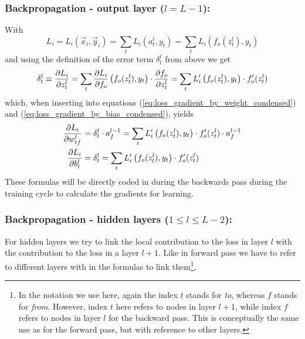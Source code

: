 \subsubsection*{Backpropagation - output layer ($l = L-1$):}

With
\begin{equation}
    L_i = L_i(\vec{x}_i, \vec{y}_i) = \sum\limits_t L_i(a_t^l,y_t)
    = \sum\limits_t L_i \left( f_o(z_t^l),y_t \right)
\end{equation}
and using the definition of the error term $\delta_t^l$ from above we get
\begin{equation}
    \delta_t^l \equiv \frac{\partial {L_i}}{\partial {z_t^l}} = \sum\limits_t \frac{\partial {L_i}}{\partial {f_o}} \left( f_o(z_t^l),y_t \right)
    \cdot \frac{\partial {f_o}}{\partial {z_t^l}}
    = \sum\limits_t L_i^\prime \left( f_o(z_t^l),y_t \right)
    \cdot f_o^\prime(z_t^l)
\end{equation}
which, when inserting into equations (\ref{eq:loss_gradient_by_weight_condensed}) and
(\ref{eq:loss_gradient_by_bias_condensed}), yields
\begin{subequations}
    \begin{align}
        \frac{\partial {L_i}}{\partial {w_{tf}^l}} & = \delta_t^l \cdot a^{l-1}_f =
        \sum\limits_t L_i^\prime \left( f_o(z_t^l),y_t \right)
        \cdot f_o^\prime(z_t^l) \cdot a^{l-1}_f 
        \label{eq:loss_gradient_by_weight_expanded}\\
        \frac{\partial {L_i}}{\partial {b^l_t}} & = \delta_t^l = 
        \sum\limits_t L_i^\prime \left( f_o(z_t^l),y_t \right)
        \cdot f_o^\prime(z_t^l)
        \label{eq:loss_gradient_by_bias_expanded}
    \end{align}
\end{subequations}
These formulas will be directly coded in during the backwards pass during the training
cycle to calculate the gradients for learning.

\subsubsection*{Backpropagation - hidden layers ($1 \leq l \leq L-2$):}

For hidden layers we try to link the local contribution to the loss in layer $l$ with the
contribution to the loss in a layer $l+1$. Like in forward pass we have to refer to
different layers with in the formulas to link them\footnote{In the notation we use here,
again the index $t$ stands for \emph{to}, whereas $f$ stands for \emph{from}. However,
index $t$ here refers to nodes in layer $l+1$, while index $f$ refers to nodes in layer
$l$ for the backward pass. This is conceptually the same use as for the forward pass, but
with reference to other layers.}. \\

